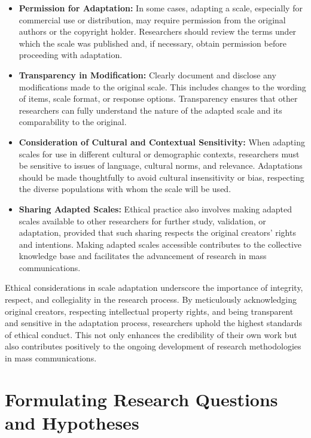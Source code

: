 \documentclass[
]{book}
\begin{document}
\begin{itemize}
\item
  \textbf{Permission for Adaptation:} In some cases, adapting a scale, especially for commercial use or distribution, may require permission from the original authors or the copyright holder. Researchers should review the terms under which the scale was published and, if necessary, obtain permission before proceeding with adaptation.
\item
  \textbf{Transparency in Modification:} Clearly document and disclose any modifications made to the original scale. This includes changes to the wording of items, scale format, or response options. Transparency ensures that other researchers can fully understand the nature of the adapted scale and its comparability to the original.
\item
  \textbf{Consideration of Cultural and Contextual Sensitivity:} When adapting scales for use in different cultural or demographic contexts, researchers must be sensitive to issues of language, cultural norms, and relevance. Adaptations should be made thoughtfully to avoid cultural insensitivity or bias, respecting the diverse populations with whom the scale will be used.
\item
  \textbf{Sharing Adapted Scales:} Ethical practice also involves making adapted scales available to other researchers for further study, validation, or adaptation, provided that such sharing respects the original creators' rights and intentions. Making adapted scales accessible contributes to the collective knowledge base and facilitates the advancement of research in mass communications.
\end{itemize}

Ethical considerations in scale adaptation underscore the importance of integrity, respect, and collegiality in the research process. By meticulously acknowledging original creators, respecting intellectual property rights, and being transparent and sensitive in the adaptation process, researchers uphold the highest standards of ethical conduct. This not only enhances the credibility of their own work but also contributes positively to the ongoing development of research methodologies in mass communications.

\hypertarget{formulating-research-questions-and-hypotheses}{%
\chapter{Formulating Research Questions and Hypotheses}\label{formulating-research-questions-and-hypotheses}}
\end{document}
